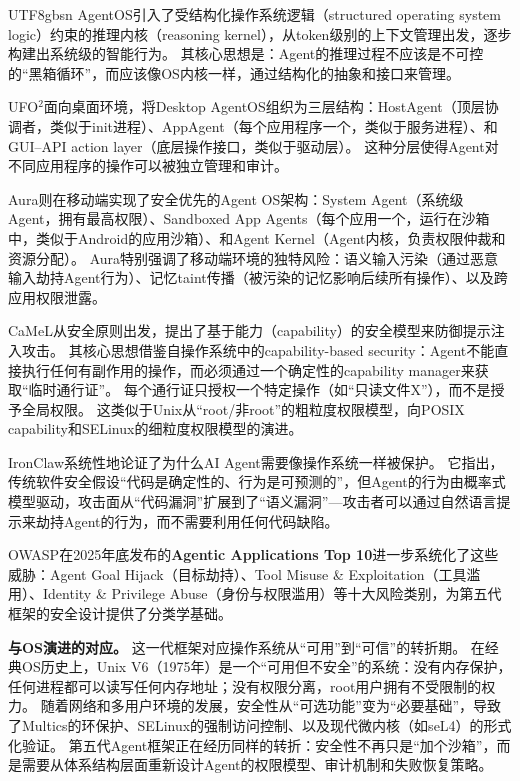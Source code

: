 \documentclass[11pt,a4paper]{article}
\begin{document}
\begin{CJK*}{UTF8}{gbsn}
AgentOS\cite{agentos2025}引入了受结构化操作系统逻辑（structured operating system logic）约束的推理内核（reasoning kernel），从token级别的上下文管理出发，逐步构建出系统级的智能行为。
其核心思想是：Agent的推理过程不应该是不可控的``黑箱循环''，而应该像OS内核一样，通过结构化的抽象和接口来管理。

UFO$^2$\cite{ufo2_2025}面向桌面环境，将Desktop AgentOS组织为三层结构：HostAgent（顶层协调者，类似于init进程）、AppAgent（每个应用程序一个，类似于服务进程）、和GUI--API action layer（底层操作接口，类似于驱动层）。
这种分层使得Agent对不同应用程序的操作可以被独立管理和审计。

Aura\cite{aura2025}则在移动端实现了安全优先的Agent OS架构：System Agent（系统级Agent，拥有最高权限）、Sandboxed App Agents（每个应用一个，运行在沙箱中，类似于Android的应用沙箱）、和Agent Kernel（Agent内核，负责权限仲裁和资源分配）。
Aura特别强调了移动端环境的独特风险：语义输入污染（通过恶意输入劫持Agent行为）、记忆taint传播（被污染的记忆影响后续所有操作）、以及跨应用权限泄露。

CaMeL\cite{debenedetti2025camel}从安全原则出发，提出了基于能力（capability）的安全模型来防御提示注入攻击。
其核心思想借鉴自操作系统中的capability-based security：Agent不能直接执行任何有副作用的操作，而必须通过一个确定性的capability manager来获取``临时通行证''。
每个通行证只授权一个特定操作（如``只读文件X''），而不是授予全局权限。
这类似于Unix从``root/非root''的粗粒度权限模型，向POSIX capability和SELinux的细粒度权限模型的演进。

IronClaw\cite{ironclaw2025}系统性地论证了为什么AI Agent需要像操作系统一样被保护。
它指出，传统软件安全假设``代码是确定性的、行为是可预测的''，但Agent的行为由概率式模型驱动，攻击面从``代码漏洞''扩展到了``语义漏洞''---攻击者可以通过自然语言提示来劫持Agent的行为，而不需要利用任何代码缺陷。

OWASP在2025年底发布的\textbf{Agentic Applications Top 10}\cite{owasp_agentic2026}进一步系统化了这些威胁：Agent Goal Hijack（目标劫持）、Tool Misuse \& Exploitation（工具滥用）、Identity \& Privilege Abuse（身份与权限滥用）等十大风险类别，为第五代框架的安全设计提供了分类学基础。

\textbf{与OS演进的对应。}
这一代框架对应操作系统从``可用''到``可信''的转折期。
在经典OS历史上，Unix V6（1975年）是一个``可用但不安全''的系统：没有内存保护，任何进程都可以读写任何内存地址；没有权限分离，root用户拥有不受限制的权力。
随着网络和多用户环境的发展，安全性从``可选功能''变为``必要基础''，导致了Multics的环保护、SELinux的强制访问控制、以及现代微内核（如seL4）的形式化验证\cite{ostep_2023}。
第五代Agent框架正在经历同样的转折：安全性不再只是``加个沙箱''，而是需要从体系结构层面重新设计Agent的权限模型、审计机制和失败恢复策略。


\end{CJK*}
\end{document}
